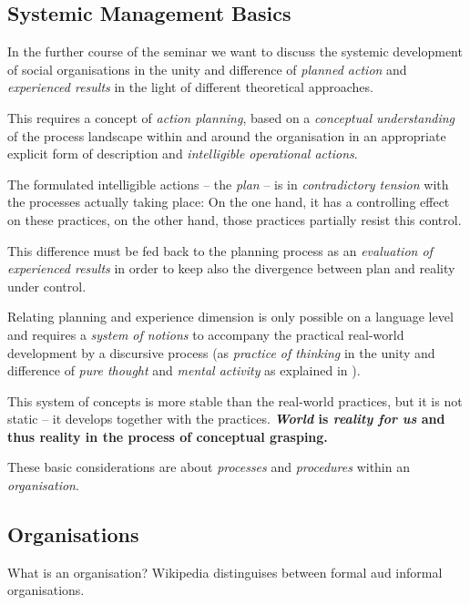 \documentclass[11pt,a4paper]{article}
\begin{document}
\subsection{Systemic Management Basics}

In the further course of the seminar we want to discuss the systemic
development of social organisations in the unity and difference of
\emph{planned action} and \emph{experienced results} in the light of different
theoretical approaches.

This requires a concept of \emph{action planning}, based on a \emph{conceptual
  understanding} of the process landscape within and around the organisation
in an appropriate explicit form of description and \emph{intelligible
  operational actions}.

The formulated intelligible actions -- the \emph{plan} -- is in
\emph{contradictory tension} with the processes actually taking place: On the
one hand, it has a controlling effect on these practices, on the other hand,
those practices partially resist this control.

This difference must be fed back to the planning process as an
\emph{evaluation of experienced results} in order to keep also the divergence
between plan and reality under control.

Relating planning and experience dimension is only possible on a language
level and requires a \emph{system of notions} to accompany the practical
real-world development by a discursive process (as \emph{practice of thinking}
in the unity and difference of \emph{pure thought} and \emph{mental activity}
as explained in \cite[p. 33-51]{MSM}).

This system of concepts is more stable than the real-world practices, but it
is not static -- it develops together with the practices.
\textbf{\emph{World} is \emph{reality for us} and thus reality in the process
  of conceptual grasping.}

These basic considerations are about \emph{processes} and \emph{procedures}
within an \emph{organisation}.

\subsection{Organisations}

What is an organisation? Wikipedia distinguises between formal aud informal
organisations. 
\end{document}

